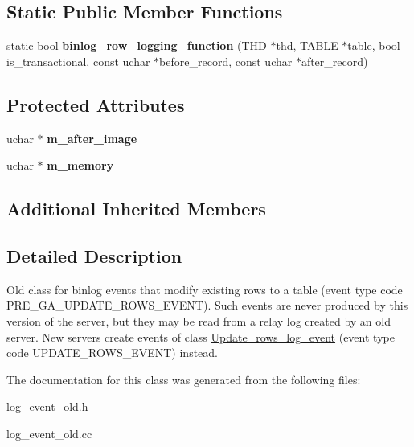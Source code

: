 \subsection*{Static Public Member Functions}
\begin{DoxyCompactItemize}
\item 
\mbox{\label{classUpdate__rows__log__event__old_a17f299a24a5e220399553f5be3c51ace}} 
static bool {\bfseries binlog\+\_\+row\+\_\+logging\+\_\+function} (T\+HD $\ast$thd, \mbox{\hyperlink{structTABLE}{T\+A\+B\+LE}} $\ast$table, bool is\+\_\+transactional, const uchar $\ast$before\+\_\+record, const uchar $\ast$after\+\_\+record)
\end{DoxyCompactItemize}
\subsection*{Protected Attributes}
\begin{DoxyCompactItemize}
\item 
\mbox{\label{classUpdate__rows__log__event__old_af7826130b64b4c3f25ef484f051f3b97}} 
uchar $\ast$ {\bfseries m\+\_\+after\+\_\+image}
\item 
\mbox{\label{classUpdate__rows__log__event__old_a798fc0f9a9f8765af7f9be938260cead}} 
uchar $\ast$ {\bfseries m\+\_\+memory}
\end{DoxyCompactItemize}
\subsection*{Additional Inherited Members}


\subsection{Detailed Description}
Old class for binlog events that modify existing rows to a table (event type code P\+R\+E\+\_\+\+G\+A\+\_\+\+U\+P\+D\+A\+T\+E\+\_\+\+R\+O\+W\+S\+\_\+\+E\+V\+E\+NT). Such events are never produced by this version of the server, but they may be read from a relay log created by an old server. New servers create events of class \mbox{\hyperlink{classUpdate__rows__log__event}{Update\+\_\+rows\+\_\+log\+\_\+event}} (event type code U\+P\+D\+A\+T\+E\+\_\+\+R\+O\+W\+S\+\_\+\+E\+V\+E\+NT) instead. 

The documentation for this class was generated from the following files\+:\begin{DoxyCompactItemize}
\item 
\mbox{\hyperlink{log__event__old_8h}{log\+\_\+event\+\_\+old.\+h}}\item 
log\+\_\+event\+\_\+old.\+cc\end{DoxyCompactItemize}
